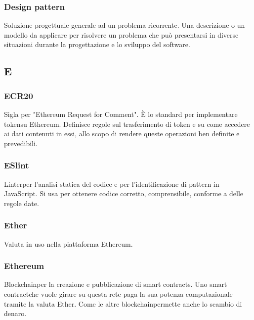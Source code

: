 \subsubsection*{Design pattern}
Soluzione progettuale generale ad un problema ricorrente. Una descrizione o un modello da applicare per risolvere un problema che può presentarsi in diverse situazioni durante la progettazione e lo sviluppo del software.


\subsection*{E}

\subsubsection*{ECR20}
Sigla per "Ethereum Request for Comment". È lo standard per implementare token\glosp su Ethereum. Definisce regole sul trasferimento di token e su come accedere ai dati contenuti in essi, allo scopo di rendere queste operazioni ben definite e prevedibili.


\subsubsection*{ESlint}
Linter\glo per l'analisi statica del codice e per l'identificazione di pattern in JavaScript. Si usa per ottenere codice corretto, comprensibile, conforme a delle regole date.

\subsubsection*{Ether}
Valuta in uso nella piattaforma Ethereum\glo.

\subsubsection*{Ethereum}
Blockchain\glosp per la creazione e pubblicazione di smart contracts\glo. Uno smart contract\glosp che vuole girare su questa rete paga la sua potenza computazionale tramite la valuta Ether. Come le altre blockchain\glosp permette anche lo scambio di denaro.

